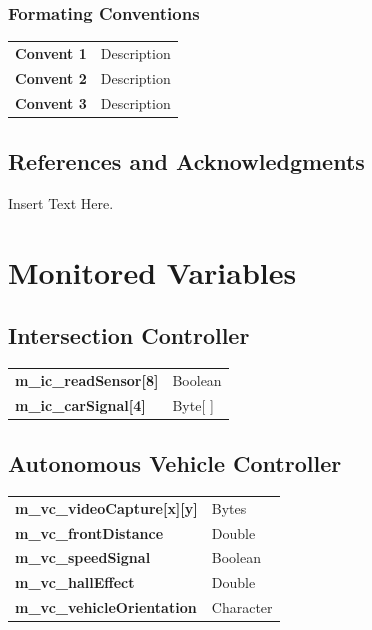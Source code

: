 \documentclass [11pt]{article}
\begin{document}
\subsubsection{Formating Conventions}
\begin{longtable}{ |p{ }   p{ }|}  \hline
\textbf{Convent 1} &  Description \\ 

\cellcolor{tableCell}\textbf{Convent 2}  & \cellcolor{tableCell}Description \\ 

\textbf{Convent 3} & Description \\ \hline
\end{longtable}
\subsection{References and Acknowledgments}
Insert Text Here. 


\section{Monitored Variables}

\subsection{Intersection Controller}

\begin{longtable}{ |p{ }  p{ }|}  \hline
\textbf{m\_ic\_readSensor[8]} & Boolean  \\

\cellcolor{tableCell}\textbf{m\_ic\_carSignal[4]}  & \cellcolor{tableCell}Byte[ ] \\  \hline
\end{longtable}

\subsection{Autonomous Vehicle Controller}

\begin{longtable}{ |p{ }  p{ }|}  \hline
\textbf{m\_vc\_videoCapture[x][y]} & Bytes  \\ 

\cellcolor{tableCell}\textbf{m\_vc\_frontDistance}  & \cellcolor{tableCell}Double \\ 


\textbf{m\_vc\_speedSignal} & Boolean \\

\cellcolor{tableCell}\textbf{m\_vc\_hallEffect}  & \cellcolor{tableCell}Double \\ 

\textbf{m\_vc\_vehicleOrientation} & Character \\\hline
\end{longtable}
\end{document}
